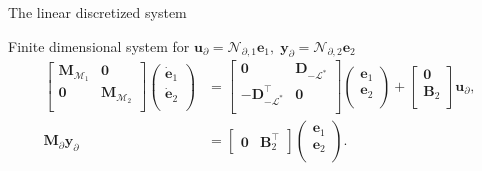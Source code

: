 \documentclass[aspectratio=169]{ISAE-Beamer}
\begin{document}
\begin{frame}{The linear discretized system}
	\begin{exampleblock}{Finite dimensional system for $\bm{u}_\partial = \mathcal{N}_{\partial, 1} \displaystyle \bm{e}_1, \;  \bm{y}_\partial = \mathcal{N}_{\partial, 2} \displaystyle \bm{e}_2$}
		\begin{equation*}
			\begin{aligned}
				\begin{bmatrix}
					\mathbf{M}_{\mathcal{M}_1} & \mathbf{0} \\
					\mathbf{0} & \mathbf{M}_{\mathcal{M}_2} \\
				\end{bmatrix}
				\begin{pmatrix}
					\dot{\mathbf{e}}_{1} \\
					\dot{\mathbf{e}}_{2} \\
				\end{pmatrix}
				&= \begin{bmatrix}
					\mathbf{0} & \mathbf{D}_{-\mathcal{L}^*} \\
					- \mathbf{D}_{-\mathcal{L}^*}^\top & \mathbf{0} \\
				\end{bmatrix} 
				\begin{pmatrix}
					\mathbf{e}_{1} \\
					\mathbf{e}_{2} \\
				\end{pmatrix} + 
				\begin{bmatrix}
					\mathbf{0}\\
					\mathbf{B}_2\\
				\end{bmatrix}
				\mathbf{u}_\partial, \\
				\mathbf{M}_\partial {\mathbf{y}_\partial} &= 
				\begin{bmatrix}
					\mathbf{0} & \mathbf{B}_2^\top 
				\end{bmatrix}\begin{pmatrix}
					\mathbf{e}_{1} \\
					\mathbf{e}_{2} \\
				\end{pmatrix}.
			\end{aligned}
		\end{equation*}
	\end{exampleblock}
	

\end{frame}
\end{document}
